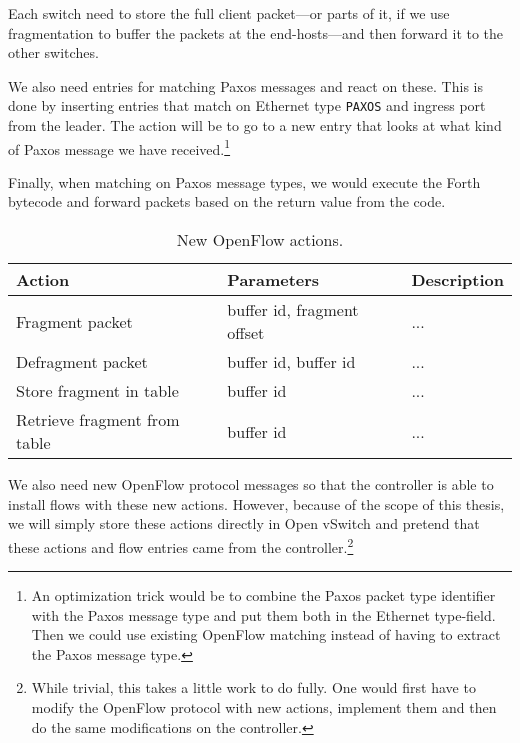 Each switch need to store the full client packet---or parts of it, if we
use fragmentation to buffer the packets at the
end-hosts---and then forward
it to the other switches.

We also need entries for matching Paxos messages and react on these.
This is done by inserting entries that match on Ethernet type
\texttt{PAXOS} and ingress port from the leader.
The action will be to go to a new entry that looks at what kind of Paxos
message we have received.\footnote{An optimization trick would be to
combine the Paxos packet type identifier with the Paxos message type and put
them both in the Ethernet type-field.  Then we could use existing OpenFlow
matching instead of having to extract the Paxos message type.}

Finally, when matching on Paxos message types, we would execute the Forth
bytecode and forward packets based on the return value from the code.

\begin{table}[H]
  \centering
  \begin{tabular}{|l|l|l|}
    \hline \textbf{Action} & \textbf{Parameters} & \textbf{Description} \\
    \hline Fragment packet & buffer id, fragment offset & ... \\
    \hline Defragment packet & buffer id, buffer id & ... \\
    \hline Store fragment in table & buffer id & ... \\
    \hline Retrieve fragment from table & buffer id & ... \\
    \hline
  \end{tabular}

  \caption{New OpenFlow actions.}
  \label{table:openflow.new.actions}
\end{table}

We also need new OpenFlow protocol messages so that the controller is able
to install flows with these new actions.  However, because of the scope of
this thesis, we will simply store these actions directly in Open
vSwitch and
pretend that these actions and flow entries came from the
controller.\footnote{While trivial, this takes a little work to do fully.
One would first have to modify the OpenFlow protocol with new
  actions,
implement them and then do the same modifications on the controller.}

